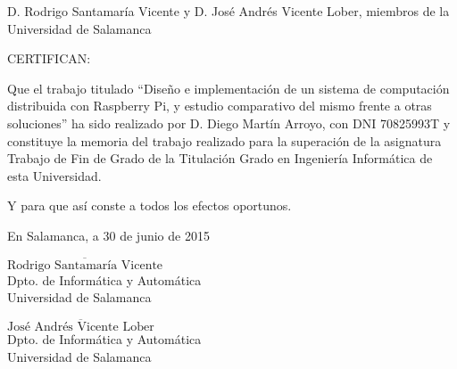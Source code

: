 D. Rodrigo Santamaría Vicente y D. José Andrés Vicente Lober, miembros de la\\ Universidad de Salamanca

\vspace{20 mm}

CERTIFICAN:

\vspace{20 mm}

Que el trabajo titulado ``Diseño e implementación de un sistema de computación distribuida con
Raspberry Pi, y estudio comparativo del mismo frente a otras soluciones'' ha sido realizado por D. Diego Martín Arroyo, con DNI 70825993T y constituye la memoria del trabajo realizado para la superación de la asignatura Trabajo de Fin de Grado de la Titulación Grado en Ingeniería Informática de esta Universidad.

\vspace{10 mm}

Y para que así conste a todos los efectos oportunos.

\vspace{15 mm}

En Salamanca, a 30 de junio de 2015

\vspace{20 mm}

\begin{minipage}[c][5cm]{.45\textwidth}
$\overline{\mbox{Rodrigo Santamaría Vicente}}$\\
Dpto. de Informática y Automática\\
Universidad de Salamanca
\end{minipage}
\hspace{0.5cm}
\begin{minipage}[c][5cm]{.45\textwidth}
\vspace{17pt}
$\overline{\mbox{José Andrés Vicente Lober}}$\\
Dpto. de Informática y Automática\\
Universidad de Salamanca\\
\end{minipage}
